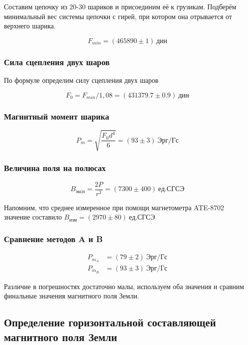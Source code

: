\documentclass[a4paper, 12pt]{article}
\begin{document}
                Составим цепочку из 20-30 шариков и присоединим её к грузикам. Подберём минимальный вес системы цепочки с гирей, при котором она отрывается от верхнего шарика.

                $$
                    F_{min} = (465890 \pm 1)~дин
                $$

            \subsubsection{Сила сцепления двух шаров}

                По формуле определим силу сцепления двух шаров

                $$
                    F_0 = F_{min} / 1,08 = (431379.7 \pm 0.9)~дин
                $$

            \subsubsection{Магнитный момент шарика}

                $$
                    P_m = \sqrt{\frac{F_0 d^4}{6}} = (93 \pm 3)~Эрг/Гс
                $$

            \subsubsection{Величина поля на полюсах}

                $$
                    B_{эксп} = \frac{2P}{r^3} = (7300 \pm 400)~ед. СГСЭ
                $$

                Напомним, что среднее измеренное при помощи магнетометра ATE-8702 значение составило $B_{изм} = (2970 \pm 80)~ед. СГСЭ$

            \subsubsection{Сравнение методов A и B}

                \begin{align*}
                    P_{m_A} &= (79 \pm 2)~Эрг/Гс \\
                    P_{m_B} &= (93 \pm 3)~Эрг/Гс
                \end{align*}

                Различие в погрешностях достаточно малы, используем оба значения и сравним финальные значения магнитного поля Земли.

        \subsection{Определение горизонтальной составляющей магнитного поля Земли}
\end{document}
